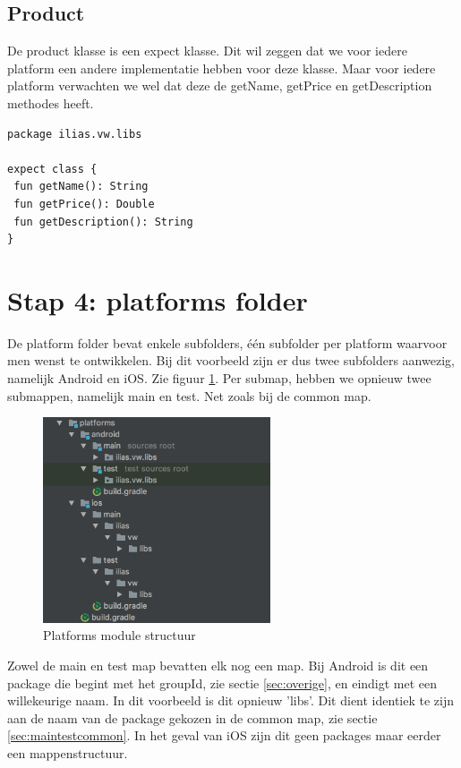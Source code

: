 \subsection{Product}
De product klasse is een expect klasse. Dit wil zeggen dat we voor iedere platform een andere implementatie hebben voor deze klasse. Maar voor iedere platform verwachten we wel dat deze de getName, getPrice en getDescription methodes heeft.

\begin{lstlisting}
package ilias.vw.libs

expect class {
 fun getName(): String
 fun getPrice(): Double
 fun getDescription(): String
}
\end{lstlisting}

\section{Stap 4: platforms folder}
De platform folder bevat enkele subfolders, één subfolder per platform waarvoor men wenst te ontwikkelen. Bij dit voorbeeld zijn er dus twee subfolders aanwezig, namelijk Android en iOS. Zie figuur \ref{fig:stap4-structuur}. Per submap, hebben we opnieuw twee submappen, namelijk main en test. Net zoals bij de common map. 

\begin{figure} [ht]
	\centering
	\includegraphics[width=0.60\textwidth]{img/stap4-structuur.png}
	\caption{Platforms module structuur}
	\label{fig:stap4-structuur}
\end{figure}

Zowel de main en test map bevatten elk nog een map. Bij Android is dit een package die begint met het groupId, zie sectie \ref{sec:overige}, en eindigt met een willekeurige naam. In dit voorbeeld is dit opnieuw 'libs'. Dit dient identiek te zijn aan de naam van de package gekozen in de common map, zie sectie \ref{sec:maintestcommon}. In het geval van iOS zijn dit geen packages maar eerder een mappenstructuur.

